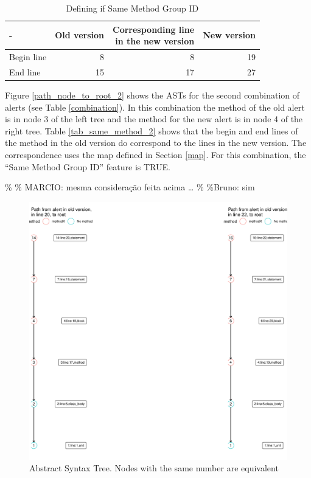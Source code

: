\documentclass[
]{article}
\begin{document}
\normalsize

\small

\begin{table}[H]

\caption{\label{tab:unnamed-chunk-9}Defining if Same Method Group ID \label{tab_same_method}}
\centering
\begin{tabular}[t]{l|r|r|r}
\hline
- & Old version & \makecell[l]{Corresponding line\\in the new version} & New version\\
\hline
Begin line & 8 & 8 & 19\\
\hline
End line & 15 & 17 & 27\\
\hline
\end{tabular}
\end{table}

\normalsize

Figure \ref{path_node_to_root_2} shows the ASTs for the second
combination of alerts (see Table \ref{combination}). In this combination
the method of the old alert is in node 3 of the left tree and the method
for the new alert is in node 4 of the right tree. Table
\ref{tab_same_method_2} shows that the begin and end lines of the method
in the old version do correspond to the lines in the new version. The
correspondence uses the map defined in Section \ref{map}. For this
combination, the ``Same Method Group ID'' feature is TRUE.

\% \% MARCIO: mesma consideração feita acima \ldots{} \% \%Bruno: sim

\small

\begin{figure}[H]
\includegraphics[width=1\linewidth]{report_files/figure-latex/unnamed-chunk-10-1} \caption{Abstract Syntax Tree. Nodes with the same number are equivalent \label{path_node_to_root_2}}\label{fig:unnamed-chunk-10}
\end{figure}
\end{document}
